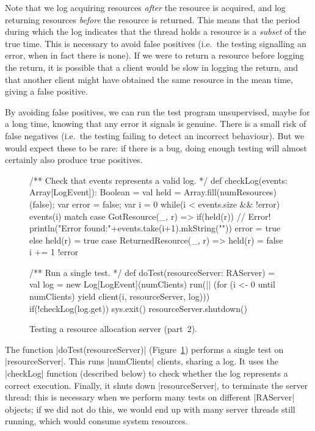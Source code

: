 

Note that we log acquiring resources \emph{after} the resource is acquired,
and log returning resources \emph{before} the resource is returned.  This
means that the period during which the log indicates that the thread holds a
resource is a \emph{subset} of the true time.
%
This is necessary to avoid false positives (i.e.~the testing signalling an
error, when in fact there is none).  If we were to return a resource before
logging the return, it is possible that a client would be slow in logging the
return, and that another client might have obtained the same resource in the
mean time, giving a false positive.

By avoiding false positives, we can run the test program unsupervised,
maybe for a long time, knowing that any error it signals is genuine.
%
There is a small risk of false negatives (i.e.~the testing failing to
detect an incorrect behaviour).  But we would expect these to be rare: if
there is a bug, doing enough testing will almost certainly also produce true
positives.



\begin{figure}
\begin{scala}
  /** Check that events represents a valid log.  */
  def checkLog(events: Array[LogEvent]): Boolean = {
    val held = Array.fill(numResources)(false); var error = false; var i = 0
    while(i < events.size && !error){
      events(i) match{
        case GotResource(_, r) =>
          if(held(r)){ // Error!
            println("Error found:\n"+events.take(i+1).mkString("\n"))
            error = true
          }
          else held(r) = true
        case ReturnedResource(_, r) => held(r) = false
      }
      i += 1
    }
    !error
  }

  /** Run a single test. */
  def doTest(resourceServer: RAServer) = {
    val log = new Log[LogEvent](numClients)
    run(|| (for (i <- 0 until numClients) yield client(i, resourceServer, log)))
    if(!checkLog(log.get)) sys.exit()
    resourceServer.shutdown()
  }
\end{scala}
\caption{Testing a resource allocation server (part~2).}
\label{fig:RATest-2}
\end{figure}


The function |doTest(resourceServer)| (Figure~\ref{fig:RATest-2}) performs a
single test on |resourceServer|.  This runs |numClients| clients, sharing a
log.  It uses the |checkLog| function (described below) to check whether the
log represents a correct execution.  Finally, it shuts down |resourceServer|, to
terminate the server thread: this is necessary when we perform many tests on
different |RAServer| objects; if we did not do this, we would end up with many
server threads still running, which would consume system resources.

